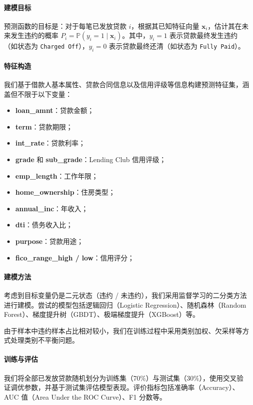 \documentclass[12pt,nonblindrev]{write_paper}
\begin{document}
\paragraph{建模目标} 
预测函数的目标是：对于每笔已发放贷款 $i$，根据其已知特征向量 $\mathbf{x}_i$，估计其在未来发生违约的概率 $P_i = \mathbb{P}(y_i = 1 \mid \mathbf{x}_i)$。其中，$y_i=1$ 表示贷款最终发生违约（如状态为 \texttt{Charged Off}），$y_i=0$ 表示贷款最终还清（如状态为 \texttt{Fully Paid}）。

\paragraph{特征构造}
我们基于借款人基本属性、贷款合同信息以及信用评级等信息构建预测特征集，涵盖但不限于以下变量：

\begin{itemize}
  \item \textbf{loan\_amnt}：贷款金额；
  \item \textbf{term}：贷款期限；
  \item \textbf{int\_rate}：贷款利率；
  \item \textbf{grade} 和 \textbf{sub\_grade}：Lending Club 信用评级；
  \item \textbf{emp\_length}：工作年限；
  \item \textbf{home\_ownership}：住房类型；
  \item \textbf{annual\_inc}：年收入；
  \item \textbf{dti}：债务收入比；
  \item \textbf{purpose}：贷款用途；
  \item \textbf{fico\_range\_high / low}：信用评分；
\end{itemize}

\paragraph{建模方法}
考虑到目标变量仍是二元状态（违约 / 未违约），我们采用监督学习的二分类方法进行建模。尝试的模型包括逻辑回归（Logistic Regression）、随机森林（Random Forest）、梯度提升树（GBDT）、极端梯度提升（XGBoost）等。

由于样本中违约样本占比相对较小，我们在训练过程中采用类别加权、欠采样等方式处理类别不平衡问题。

\paragraph{训练与评估}

我们将全部已发放贷款随机划分为训练集（70\%）与测试集（30\%），使用交叉验证调优参数，并基于测试集评估模型表现。评价指标包括准确率（Accuracy）、AUC 值（Area Under the ROC Curve）、F1 分数等。
\end{document}

